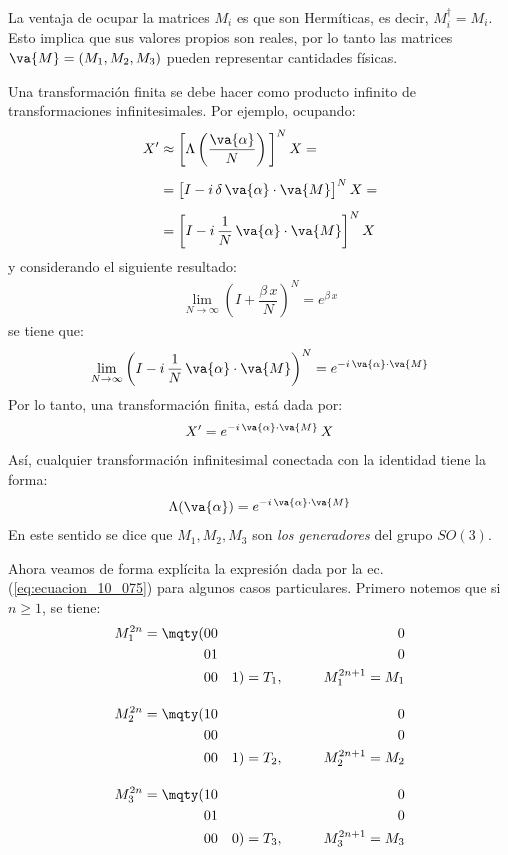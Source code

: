 La ventaja de ocupar la matrices $M_{i}$ es que son Hermíticas, es decir, \break \hfill $M_{i}^{\dagger} = M_{i}$. Esto implica que sus valores propios son reales, por lo tanto las matrices
$\va{M} = (M_{1} , M_{2} , M_{3})$ pueden representar cantidades físicas.
\par
Una transformación finita se debe hacer como producto infinito de transformaciones infinitesimales. Por ejemplo, ocupando:
\begin{align}
\begin{aligned}[b]
X^{\prime} &\approx \bigg[ \Lambda \left( \dfrac{\va{\alpha}}{N} \right) \bigg]^{N} \, X = \\[0.5em]
&= \big[ I - i \, \delta \, \va{\alpha} \cdot \va{M} \big]^{N} \, X = \\[0.5em]
&= \bigg[ I - i \, \dfrac{1}{N} \, \va{\alpha} \cdot \va{M} \bigg]^{N} \, X
\end{aligned}
\label{eq:ecuacion_10_071}
\end{align}
y considerando el siguiente resultado:
\begin{align}
\lim_{N \to \infty} \left(  I + \dfrac{\beta \, x}{N} \right)^{N} = e^{\beta \, x}
\label{eq:ecuacion_10_072}
\end{align}
se tiene que:
\begin{align}
\lim_{N \to \infty} \left(  I - i \, \dfrac{1}{N} \, \va{\alpha} \cdot \va{M} \right)^{N} = e^{- i \, \va{\alpha} \cdot \va{M}}
\label{eq:ecuacion_10_073}
\end{align}
Por lo tanto, una transformación finita, está dada por:
\begin{align}
X^{\prime} = e^{- i \, \va{\alpha} \cdot \va{M}} \, X
\label{eq:ecuacion_10_074}
\end{align}
Así, cualquier transformación infinitesimal conectada con la identidad tiene la forma:
\begin{align}
\Lambda (\va{\alpha}) = e^{- i \, \va{\alpha} \cdot \va{M}}
\label{eq:ecuacion_10_075}
\end{align}
En este sentido se dice que $M_{1}, M_{2}, M_{3}$ son \emph{los generadores} del grupo $SO(3)$.
\par
Ahora veamos de forma explícita la expresión dada por la ec.(\ref{eq:ecuacion_10_075}) para algunos casos particulares. Primero notemos que si $n \geq 1$, se tiene:
\begin{align}
M_{1}^{2n} = \mqty(0 & 0 & 0 \\ 0 & 1 & 0 \\ 0 & 0 & 1) = T_{1}, \hspace{1cm} M_{1}^{2n + 1} = M_{1}  \label{eq:ecuacion_10_076} \\[1em]
M_{2}^{2n} = \mqty(1 & 0 & 0 \\ 0 & 0 & 0 \\ 0 & 0 & 1) = T_{2}, \hspace{1cm} M_{2}^{2n + 1} = M_{2}  \label{eq:ecuacion_10_077} \\[1em]
M_{3}^{2n} = \mqty(1 & 0 & 0 \\ 0 & 1 & 0 \\ 0 & 0 & 0) = T_{3}, \hspace{1cm} M_{3}^{2n + 1} = M_{3}  \label{eq:ecuacion_10_078}
\end{align}
